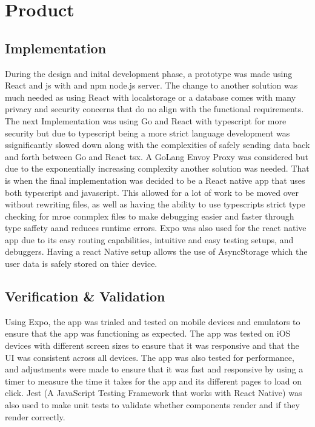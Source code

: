 \section{Product}\label{product}

\subsection{Implementation}
During the design and inital development phase, a prototype was made using React and js with and npm node.js server. The change to another solution was much needed as using React with localstorage or a database comes with many privacy and security concerns that do no align with the functional requirements. The next Implementation was using Go and React with typescript for more security but due to typescript being a more strict language development was ssignificantly slowed down along with the complexities of safely sending data back and forth between Go and React tsx. A GoLang Envoy Proxy was considered but due to the exponentially increasing complexity another solution was needed. That is when the final implementation was decided to be a React native app that uses both typescript and javascript. This allowed for a lot of work to be moved over without rewriting files, as well as having the ability to use typescripts strict type checking for mroe conmplex files to make debugging easier and faster through type saffety aand reduces runtime errors. Expo was also used for the react native app due to its easy routing capabilities, intuitive and easy testing setups, and debuggers. Having a react Native setup allows the use of AsyncStorage which the user data is safely stored on thier device.

\subsection{Verification \& Validation}
Using Expo, the app was trialed and tested on mobile devices and emulators to ensure that the app was functioning as expected. The app was tested on iOS devices with different screen sizes to ensure that it was responsive and that the UI was consistent across all devices. The app was also tested for performance, and adjustments were made to ensure that it was fast and responsive by using a timer to measure the time it takes for the app and its different pages to load on click. Jest (A JavaScript Testing Framework that works with React Native) was also used to make unit tests to validate whether components render and if they render correctly.


